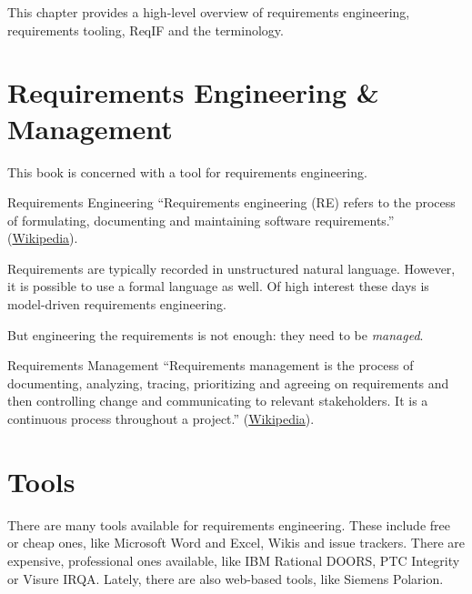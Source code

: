 This chapter provides a high-level overview of requirements engineering, requirements tooling, ReqIF and the terminology.

\section{Requirements Engineering \& Management}
\label{sec:requirements_engineering}

This book is concerned with \pror{} a tool for requirements engineering.

\begin{definition}{Requirements Engineering}
``Requirements engineering (RE) refers to the process of formulating, documenting and maintaining software requirements.'' (\href{http://en.wikipedia.org/wiki/Requirements_engineering}{Wikipedia}).

Requirements are typically recorded in unstructured natural language. However, it is possible to use a formal language as well. Of high interest these days is model-driven requirements engineering.
\end{definition}

But engineering the requirements is not enough: they need to be \textit{managed}.

\begin{definition}{Requirements Management}
``Requirements management is the process of documenting, analyzing, tracing, prioritizing and agreeing on requirements and then controlling change and communicating to relevant stakeholders. It is a continuous process throughout a project.'' (\href{http://en.wikipedia.org/wiki/Requirements_management}{Wikipedia}).
\end{definition}

\section{Tools}
\label{sec:re-tools}

There are many tools available for requirements engineering.  These include free or cheap ones, like Microsoft Word and Excel, Wikis and issue trackers.  There are expensive, professional ones available, like IBM\textregistered{} Rational\textregistered{} DOORS\textregistered{}, PTC Integrity or Visure IRQA.  Lately, there are also web-based tools, like Siemens Polarion.

